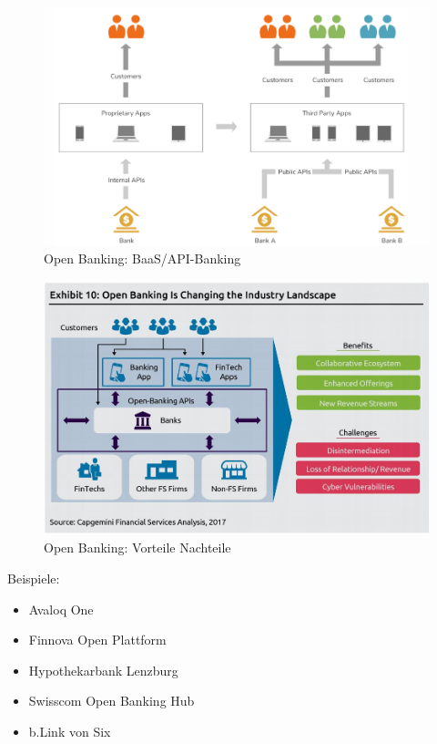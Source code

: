 \documentclass[../Main.tex]{subfiles}
\begin{document}
\begin{figure}[H]
    \centering
    \includegraphics[width=1\linewidth]{Images/digbus/openbanking.png}
    \caption{Open Banking: BaaS/API-Banking}
\end{figure}
\begin{figure}[H]
    \centering
    \includegraphics[width=1\linewidth]{Images/digbus/baas.png}
    \caption{Open Banking: Vorteile Nachteile}
\end{figure}

Beispiele:
\begin{itemize}
    \item Avaloq One
    \item Finnova Open Plattform
    \item Hypothekarbank Lenzburg
    \item Swisscom Open Banking Hub
    \item b.Link von Six
\end{itemize}
\end{document}
